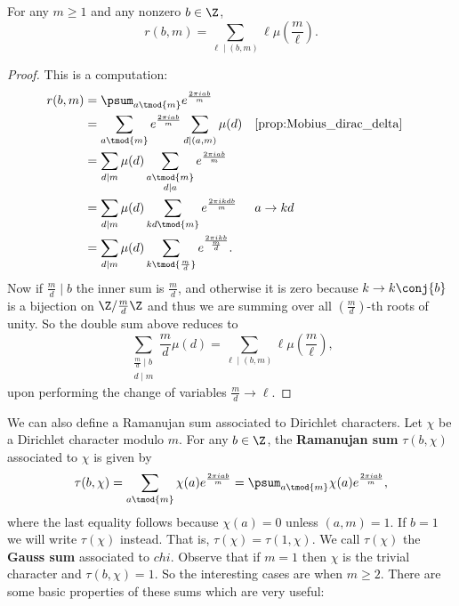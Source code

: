         \begin{proposition}\label{prop:Ramanujan_sum_evaluation}
          For any $m \ge 1$ and any nonzero $b \in \Z$,
          \[
            r(b,m) = \sum_{\ell \mid (b,m)}\ell\mu\left(\frac{m}{\ell}\right).
          \]
        \end{proposition}
        \begin{proof}
          This is a computation:
          \begin{align*}
            r(b,m) &= \psum_{a \tmod{m}}e^{\frac{2\pi iab}{m}} \\
            &= \sum_{a \tmod{m}}e^{\frac{2\pi iab}{m}}\sum_{d \mid (a,m)}\mu(d) && \text{\cref{prop:Mobius_dirac_delta}} \\
            &= \sum_{d \mid m}\mu(d)\sum_{\substack{a \tmod{m} \\ d \mid a}}e^{\frac{2\pi iab}{m}} \\
            &= \sum_{d \mid m}\mu(d)\sum_{kd \tmod{m}}e^{\frac{2\pi ikdb}{m}} && \text{$a \to kd$} \\
            &= \sum_{d \mid m}\mu(d)\sum_{k \tmod{\frac{m}{d}}}e^{\frac{2\pi ik b}{\frac{m}{d}}}.
          \end{align*}
          Now if $\frac{m}{d} \mid b$ the inner sum is $\frac{m}{d}$, and otherwise it is zero because $k \to k\conj{b}$ is a bijection on $\Z/\frac{m}{d}\Z$ and thus we are summing over all $\left(\frac{m}{d}\right)$-th roots of unity. So the double sum above reduces to
          \[
            \sum_{\substack{\frac{m}{d} \mid b \\ d \mid m}}\frac{m}{d}\mu(d) = \sum_{\ell \mid (b,m)}\ell\mu\left(\frac{m}{\ell}\right),
          \]
          upon performing the change of variables $\frac{m}{d} \to \ell$.
        \end{proof}
        We can also define a Ramanujan sum associated to Dirichlet characters. Let $\chi$ be a Dirichlet character modulo $m$. For any $b \in \Z$, the \textbf{Ramanujan sum} $\tau(b,\chi)$ associated to $\chi$ is given by
        \[
          \tau(b,\chi) = \sum_{a \tmod{m}}\chi(a)e^{\frac{2\pi iab}{m}} = \psum_{a \tmod{m}}\chi(a)e^{\frac{2\pi iab}{m}},
        \]
        where the last equality follows because $\chi(a) = 0$ unless $(a,m) = 1$. If $b = 1$ we will write $\tau(\chi)$ instead. That is, $\tau(\chi) = \tau(1,\chi)$. We call $\tau(\chi)$ the \textbf{Gauss sum} associated to $chi$. Observe that if $m = 1$ then $\chi$ is the trivial character and $\tau(b,\chi) = 1$. So the interesting cases are when $m \ge 2$. There are some basic properties of these sums which are very useful:

